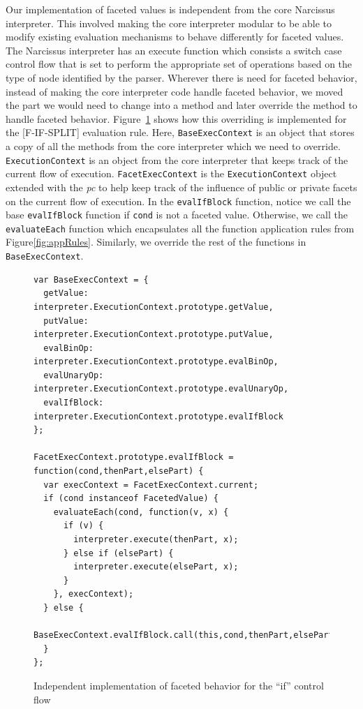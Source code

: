 Our implementation of faceted values is independent from the core Narcissus interpreter.
This involved making the core interpreter modular to be able to modify existing
evaluation mechanisms to behave differently for faceted values. The Narcissus interpreter
has an execute function which consists a switch case control flow that is set to
perform the appropriate set of operations based on the type of node identified by
the parser. Wherever there is need for faceted behavior, instead of making the core
interpreter code handle faceted behavior, we moved the part we would need to change
into a method and later override the method to handle faceted behavior.
Figure~\ref{fig:facetif} shows how this overriding is implemented for the [F-IF-SPLIT]
evaluation rule. Here, \texttt{BaseExecContext} is an object that stores a copy of all the
methods from the core interpreter which we need to override. \texttt{ExecutionContext}
is an object from the core interpreter that keeps track of the current flow of execution.
\texttt{FacetExecContext} is the \texttt{ExecutionContext} object extended with
the \textit{pc} to help keep track of the influence of public or private facets
on the current flow of execution. In the \texttt{evalIfBlock} function, notice we
call the base \texttt{evalIfBlock} function if \texttt{cond} is not a faceted value.
Otherwise, we call the \texttt{evaluateEach} function which encapsulates all the
function application rules from Figure\ref{fig:appRules}. Similarly, we override
the rest of the functions in \texttt{BaseExecContext}.
\lstset{
  language=javascript,
  frame=single,
  breaklines=true,
  basicstyle=\footnotesize\ttfamily,
  numbers=left,
  extendedchars=true,
  tabsize=2
}
\begin{figure}
  \begin{lstlisting}
var BaseExecContext = {
  getValue: interpreter.ExecutionContext.prototype.getValue,
  putValue: interpreter.ExecutionContext.prototype.putValue,
  evalBinOp: interpreter.ExecutionContext.prototype.evalBinOp,
  evalUnaryOp: interpreter.ExecutionContext.prototype.evalUnaryOp,
  evalIfBlock: interpreter.ExecutionContext.prototype.evalIfBlock
};

FacetExecContext.prototype.evalIfBlock = function(cond,thenPart,elsePart) {
  var execContext = FacetExecContext.current;
  if (cond instanceof FacetedValue) {
    evaluateEach(cond, function(v, x) {
      if (v) {
        interpreter.execute(thenPart, x);
      } else if (elsePart) {
        interpreter.execute(elsePart, x);
      }
    }, execContext);
  } else {
    BaseExecContext.evalIfBlock.call(this,cond,thenPart,elsePart);
  }
};
  \end{lstlisting}
  \caption{Independent implementation of faceted behavior for the ``if'' control flow}
  \label{fig:facetif}
\end{figure}

